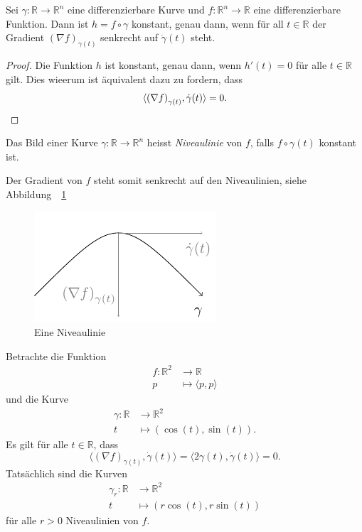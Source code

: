 \documentclass[../main.tex]{subfiles}
\begin{document}
\begin{proposition}
  Sei $\gamma \colon \mathbb{R} \to \mathbb{R}^n$ 
  eine differenzierbare Kurve und 
  $f \colon \mathbb{R}^n \to \mathbb{R}$ eine
  differenzierbare Funktion.
  Dann ist $h = f \circ \gamma$ konstant, genau dann,
  wenn für all $t \in \mathbb{R}$ 
  der Gradient ${(\nabla f)}_{\gamma(t)}$ senkrecht auf
  $\dot \gamma(t)$ steht.
\end{proposition}

\begin{proof}
  Die Funktion $h$ ist konstant, genau dann,
  wenn $h'(t) = 0$ für alle $t \in \mathbb{R}$ gilt.
  Dies wieerum ist äquivalent dazu zu fordern, dass
  \[
    \langle {(\nabla f)}_{\gamma(t)}, \dot \gamma(t) \rangle = 0.
    \qedhere
  \]
\end{proof}

\begin{definition}
  Das Bild einer Kurve $\gamma \colon \mathbb{R} \to \mathbb{R}^n$ 
  heisst \emph{Niveaulinie} von $f$,
  falls $f \circ \gamma(t)$ konstant ist.
\end{definition}

Der Gradient von $f$ steht somit senkrecht auf den Niveaulinien, siehe Abbildung~~\ref{fig:niveau}

\begin{figure}[htb]
  \centering
  \includegraphics{figures/niveau}
  \caption{Eine Niveaulinie}%
  \label{fig:niveau}
\end{figure}

\begin{example}
  Betrachte die Funktion
  \begin{align*}
    f \colon \mathbb{R}^2 & \to \mathbb{R} \\
    p & \mapsto \langle p, p \rangle
  \end{align*}
  und die Kurve
  \begin{align*}
    \gamma \colon \mathbb{R} & \to \mathbb{R}^2 \\
    t & \mapsto (\cos(t), \sin(t)).
  \end{align*}
  Es gilt für alle $t \in \mathbb{R}$,
  dass
  \[
  \langle {(\nabla f)}_{\gamma(t)}, \dot \gamma(t) \rangle
  = \langle 2 \gamma(t), \dot \gamma(t) \rangle = 0.
  \]
  Tatsächlich sind die Kurven
  \begin{align*}
    \gamma_r \colon \mathbb{R} & \to \mathbb{R}^2 \\
    t & \mapsto (r\cos(t), r\sin(t))
  \end{align*}
  für alle $r > 0$ Niveaulinien von $f$.
\end{example}
\end{document}
